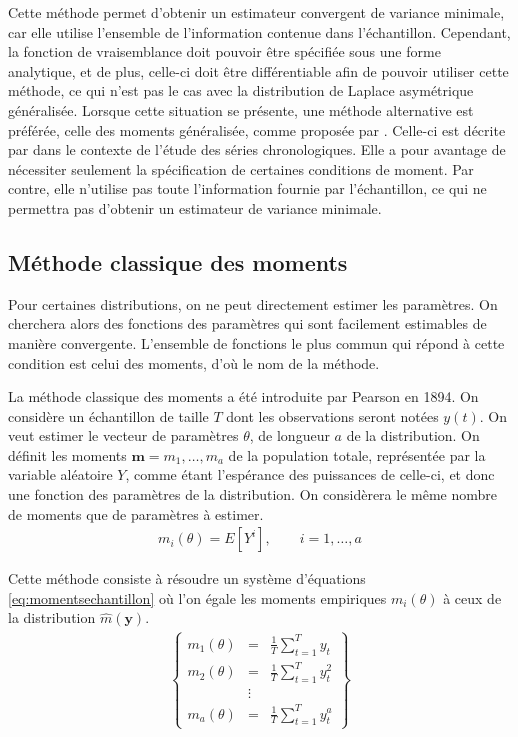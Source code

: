 Cette méthode permet d'obtenir un estimateur convergent de variance
minimale, car elle utilise l'ensemble de l'information contenue dans
l'échantillon. Cependant, la fonction de vraisemblance doit pouvoir
être spécifiée sous une forme analytique, et de plus, celle-ci doit
être différentiable afin de pouvoir utiliser cette méthode, ce qui
n'est pas le cas avec la distribution de Laplace asymétrique
généralisée. Lorsque cette situation se présente, une méthode
alternative est préférée, celle des moments généralisée, comme
proposée par \cite{hansen1982large}. Celle-ci est décrite par
\cite{hamilton1994time} dans le contexte de l'étude des séries
chronologiques. Elle a pour avantage de nécessiter seulement la
spécification de certaines conditions de moment. Par contre, elle
n'utilise pas toute l'information fournie par l'échantillon, ce qui ne
permettra pas d'obtenir un estimateur de variance minimale.

\subsection{Méthode classique des moments}
\label{sec:methodemoments}

Pour certaines distributions, on ne peut directement estimer les
paramètres. On cherchera alors des fonctions des paramètres qui sont
facilement estimables de manière convergente. L'ensemble de fonctions
le plus commun qui répond à cette condition est celui des moments,
d'où le nom de la méthode.

La méthode classique des moments a été introduite par Pearson en
1894. On considère un échantillon de taille $T$ dont les observations
seront notées $y(t)$. On veut estimer le vecteur de paramètres
$\theta$, de longueur $a$ de la distribution. On définit les moments
$\mathbf{m} = m_1, \ldots, m_a$ de la population totale,
représentée par la variable aléatoire $Y$, comme étant l'espérance des
puissances de celle-ci, et donc une fonction des paramètres de la
distribution. On considèrera le même nombre de moments que de
paramètres à estimer.
\begin{align}
  \label{eq:momentspopulation}
  m_i\left( \theta \right) = E \left[ Y^i \right] ,\qquad i=1,
  \ldots, a
\end{align}

Cette méthode consiste à résoudre un système d'équations
\eqref{eq:momentsechantillon} où l'on égale les moments empiriques
$m_i(\theta)$ à ceux de la distribution $\hat{m}(\mathbf{y})$.
\begin{align}
  \label{eq:momentsechantillon}
  \left\{\begin{array}{rcl}
      m_1(\theta) &=& \frac{1}{T}\sum_{t=1}^T y_t\\
      m_2(\theta) &=& \frac{1}{T}\sum_{t=1}^T y_t^2\\
      &\vdots& \\
      m_a(\theta) &=& \frac{1}{T}\sum_{t=1}^T y_t^a
    \end{array}\right\}
\end{align}

